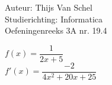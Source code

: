 \documentclass[a4paper]{article}
\begin{document}
  
\noindent \large Auteur: Thijs Van Schel \\
\noindent \large Studierichting: Informatica\\
\noindent \large Oefeningenreeks 3A nr. 19.4\\

\medskip

\normalsize

$f(x) = \dfrac{1}{2x+5}$ \\

$f'(x) = \dfrac{-2}{4x^2+20x+25}$
\begin{thebibliography}{999}
\end{thebibliography}
\end{document}
